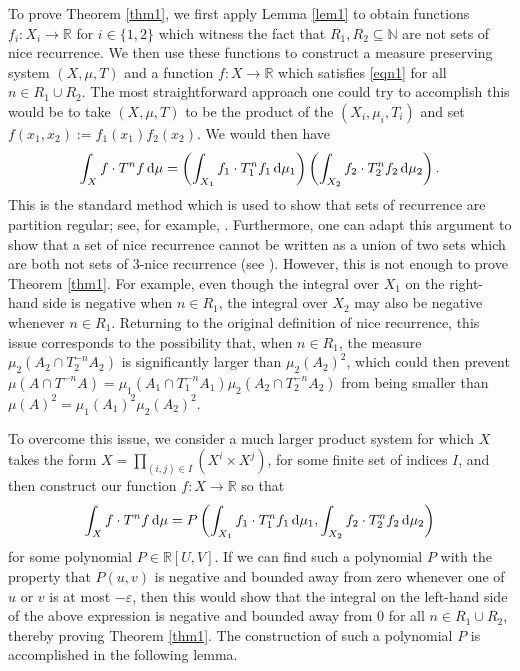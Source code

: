 \documentclass[reqno,a4paper,12pt]{amsart}
\theoremstyle{definition}
\theoremstyle{remark}
\def\d{{\,{\rm d}}}
\def \N {\mathbb{N}}
\def \R {\mathbb{R}}
\def\eps{\varepsilon}
\begin{document}
To prove Theorem \ref{thm1}, we first apply Lemma \ref{lem1} to obtain functions $f_i:X_i\to\R$ for $i\in\{1,2\}$ which witness the fact that $R_1,R_2\subseteq\N$ are not sets of nice recurrence. We then use these functions to construct a measure preserving system $(X,\mu,T)$ and a function $f:X\to \R$ which satisfies \eqref{eqn1} for all $n\in R_1\cup R_2$. 
The most straightforward approach one could try to accomplish this would be to take $(X,\mu,T)$ to be the product of the $(X_i,\mu_i,T_i)$ and set $f(x_1,x_2):=f_1(x_1)f_2(x_2)$. We would then have
\begin{equation*}
    \int_X f\cdot T^nf \d\mu = \left(\int_{X_1}f_1\cdot T_1^nf_1 \d\mu_1\right)\left(\int_{X_2}f_2\cdot T_2^nf_2 \d\mu_2\right).
\end{equation*}
This is the standard method which is used to show that sets of recurrence are partition regular; see, for example, \cite[Proposition 1.3]{For1990}. Furthermore, one can adapt this argument to show that a set of nice recurrence cannot be written as a union of two sets which are both not sets of $3$-nice recurrence (see \cite[Proposition 2.3]{For1990}). 
However, this is not enough to prove Theorem \ref{thm1}. For example, even though the integral over $X_1$ on the right-hand side is negative when $n\in R_1$, the integral over $X_2$ may also be negative whenever $n\in R_1$. Returning to the original definition of nice recurrence, this issue corresponds to the possibility that, when $n\in R_1$, the measure $\mu_2(A_2\cap T_2^{-n}A_2)$ is significantly larger than $\mu_2(A_2)^2$, which could then prevent $\mu(A\cap T^{-n}A)=\mu_1(A_1\cap T_1^{-n}A_1)\mu_2(A_2\cap T_2^{-n}A_2)$ from being smaller than $\mu(A)^2 = \mu_1(A_1)^2\mu_2(A_2)^2$.

To overcome this issue, we consider a much larger product system for which $X$ takes the form $X=\prod_{(i,j)\in I} (X^i\times X^j)$, for some finite set of indices $I$, and then construct our function $f:X\to\R$ so that
\begin{equation*}
    \int_X f\cdot T^nf \d\mu = P\left(\int_{X_1}f_1\cdot T_1^nf_1 \d\mu_1,\int_{X_2}f_2\cdot T_2^nf_2 \d\mu_2\right)
\end{equation*}
for some polynomial $P\in\R[U,V]$. If we can find such a polynomial $P$ with the property that $P(u,v)$ is negative and bounded away from zero whenever one of $u$ or $v$ is at most $-\eps$, then this would show that the integral on the left-hand side of the above expression is negative and bounded away from $0$ for all $n\in R_1\cup R_2$, thereby proving Theorem \ref{thm1}. The construction of such a polynomial $P$ is accomplished in the following lemma.
\end{document}
